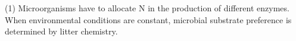 \documentclass[authoryear,preprint,review,12pt]{elsarticle}
\begin{document}
                                                                                                                                                                                                                                                                                                                                                                                                                                                                                                                                                                                                                                                                                                                                                                                                                                                                                                                                                                                                                                                                                                                                                                                                                                                                                                                                                                                                                                                                                                                                        (1) Microorganisms have to allocate N in the production of different enzymes. When environmental conditions are constant, microbial substrate preference is determined by litter chemistry.
\end{document}
